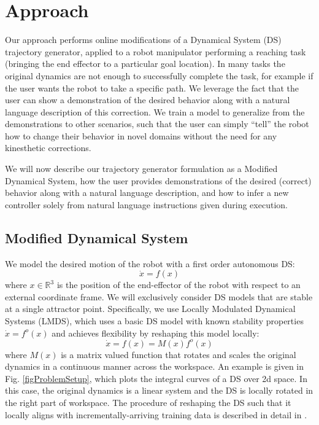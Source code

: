

\section{Approach}
\label{sec:approach}

Our approach performs online modifications of a Dynamical System (DS) trajectory generator, applied to a robot manipulator performing a reaching task (bringing the end effector to a particular goal location).
In many tasks the original dynamics are not enough to successfully complete the task, for example if the user wants the robot to take a specific path.
We leverage the fact that the user can show a demonstration of the desired behavior along with a natural language description of this correction.
We train a model to generalize from the demonstrations to other scenarios, such that the user can simply ``tell'' the robot how to change their behavior in novel domains without the need for any kinesthetic corrections.

We will now describe our trajectory generator formulation as a Modified Dynamical System, how the user provides demonstrations of the desired (correct) behavior along with a natural language description, and how to infer a new controller solely from natural language instructions given during execution.

\subsection{Modified Dynamical System}

We model the desired motion of the robot with a first order autonomous DS:
\begin{equation}
  \label{eq:DS_general}
  \dot x = f(x)
\end{equation}
where $x \in \mathbb{R}^3$ is the position of the end-effector of the robot with respect to an external coordinate frame. We will exclusively consider DS models that are stable at a single attractor point. Specifically, we use Locally Modulated Dynamical Systems (LMDS), which uses a basic DS model with known stability properties $\dot x = f^o(x)$ and achieves flexibility by reshaping this model locally:
\begin{equation}
  \label{eq:DS_reshaped}
  \dot x = f(x) = M(x)f^o(x)
\end{equation}
where $M(x)$ is a matrix valued function that rotates and scales the original dynamics in a continuous manner across the workspace. An example is given in Fig. \ref{figProblemSetup}, which plots the integral curves of a DS over 2d space. In this case, the original dynamics is a linear system and the DS is locally rotated in the right part of workspace. The procedure of reshaping the DS such that it locally aligns with incrementally-arriving training data is described in detail in .


